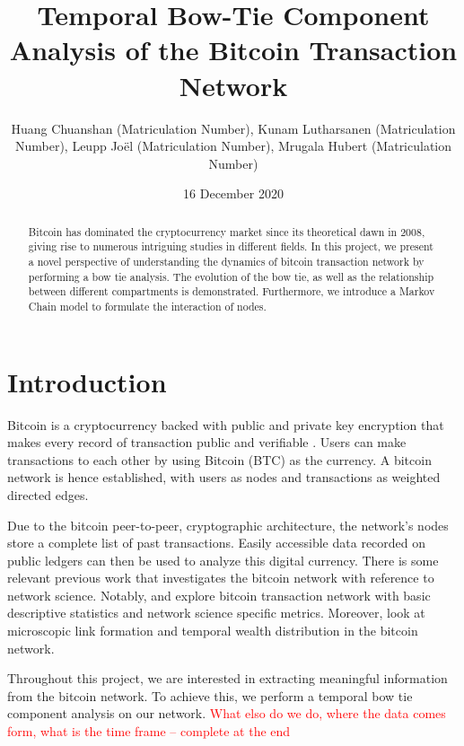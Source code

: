 \documentclass{Resources/netsci-project}
\begin{document}

\title{Temporal Bow-Tie Component Analysis of the Bitcoin Transaction Network}
\author{Huang Chuanshan (Matriculation Number), Kunam Lutharsanen (Matriculation Number), Leupp Joël (Matriculation Number), Mrugala Hubert (Matriculation Number)}
\date{16 December 2020}

\maketitle

\begin{abstract}
Bitcoin has dominated the cryptocurrency market since its theoretical dawn in 2008, giving rise to numerous intriguing studies in different fields. In this project, we present a novel perspective of understanding the dynamics of bitcoin transaction network by performing a bow tie analysis. The evolution of the bow tie, as well as the relationship between different compartments is demonstrated. Furthermore, we introduce a Markov Chain model to formulate the interaction of nodes.
\end{abstract}

\section{Introduction}

Bitcoin is a cryptocurrency backed with public and private key encryption that makes every record of transaction public and verifiable \autocite{Nakamoto2008}. Users can make transactions to each other by using Bitcoin (BTC) as the currency. A bitcoin network is hence established, with users as nodes and transactions as weighted directed edges.  

Due to the bitcoin peer-to-peer, cryptographic architecture, the network's nodes store a complete list of past transactions. Easily accessible data recorded on public ledgers can then be used to analyze this digital currency. There is some relevant previous work that investigates the bitcoin network with reference to network science. Notably, \textcite{Lischke2016} and \textcite{Baumann2014} explore bitcoin transaction network with basic descriptive statistics and network science specific metrics. Moreover, \textcite{Kondor2014} look at microscopic link formation and temporal wealth distribution in the bitcoin network.

Throughout this project, we are interested in extracting meaningful information from the bitcoin network. To achieve this, we perform a temporal bow tie component analysis on our network. \textcolor{red}{What elso do we do, where the data comes form, what is the time frame -- complete at the end}
\end{document}
